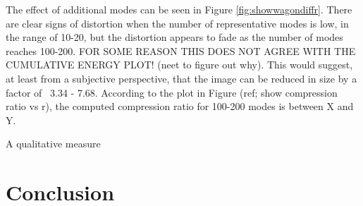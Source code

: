 \documentclass[conference]{IEEEtran}
\begin{document}
    The effect of additional modes can be seen in Figure \ref{fig:showwagondiffr}. There are clear signs of distortion when the number of representative modes is low, in the range of 10-20, but the distortion appears to fade as the number of modes reaches 100-200. FOR SOME REASON THIS DOES NOT AGREE WITH THE CUMULATIVE ENERGY PLOT! (neet to figure out why). This would suggest, at least from a subjective perspective, that the image can be reduced in size by a factor of ~3.34 - 7.68. According to the plot in Figure (ref; show compression ratio vs r), the computed compression ratio for 100-200 modes is between X and Y.


    A qualitative measure 

    




    \section{Conclusion}
    

    \nocite{jaradet_svd_image_compression}
    \nocite{shlens_2014_tutorial}
    \nocite{omar_image_compression}
    \nocite{xu_color_conversion}
    \newpage
    {}
    
\end{document}
